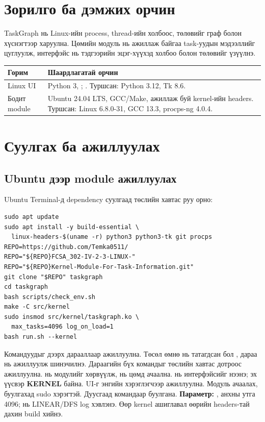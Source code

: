 
\renewcommand{\docname}{Хэрэглэгчийн гарын авлага}

\setlength{\emergencystretch}{8em}


\section{Зорилго ба дэмжих орчин}
TaskGraph нь Linux-ийн process, thread-ийн холбоос, төлөвийг граф болон хүснэгтээр харуулна. Цөмийн модуль нь ажиллаж байгаа task-уудын мэдээллийг цуглуулж, интерфэйс нь тэдгээрийн эцэг-хүүхэд холбоо болон төлөвийг үзүүлнэ.
\begin{table}[H]
\centering\small
\begin{tabularx}{\textwidth}{@{}P{3.2cm}Y@{}}\toprule
Горим & Шаардлагатай орчин \\\midrule
Linux UI & Python 3, ; . Туршсан: Python 3.12, Tk 8.6. \\
Бодит module & Ubuntu 24.04 LTS, GCC/Make, ажиллаж буй kernel-ийн headers. Туршсан: Linux 6.8.0-31, GCC 13.3, procps-ng 4.0.4. \\
\end{tabularx}
\end{table}

\section{Суулгах ба ажиллуулах}
\subsection{Ubuntu дээр module ажиллуулах}
Ubuntu Terminal-д dependency суулгаад төслийн хавтас руу орно:
\begin{lstlisting}
sudo apt update
sudo apt install -y build-essential \
  linux-headers-$(uname -r) python3 python3-tk git procps
REPO=https://github.com/Temka0511/
REPO="${REPO}FCSA_302-IV-2-3-LINUX-"
REPO="${REPO}Kernel-Module-For-Task-Information.git"
git clone "$REPO" taskgraph
cd taskgraph
bash scripts/check_env.sh
make -C src/kernel
sudo insmod src/kernel/taskgraph.ko \
  max_tasks=4096 log_on_load=1
bash run.sh --kernel
\end{lstlisting}
Командуудыг дээрх дарааллаар ажиллуулна. Төсөл өмнө нь татагдсан бол , дараа нь  ажиллуулж шинэчилнэ. Дараагийн бүх командыг төслийн хавтас дотроос ажиллуулна.
\code{make} нь модулийг хөрвүүлж,  нь цөмд ачаална.  нь интерфэйсийг нээнэ; эх үүсвэр \textbf{KERNEL} байна. UI-г энгийн хэрэглэгчээр ажиллуулна. Модуль ачаалах, буулгахад sudo хэрэгтэй. Дуусгаад  командаар буулгана.
\textbf{Параметр:} \code{max\_tasks=16..16384}, анхны утга 4096; \code{log\_on\_load=1} нь LINEAR/DFS log хэвлэнэ. Өөр kernel ашиглавал өөрийн headers-тай дахин build хийнэ.

